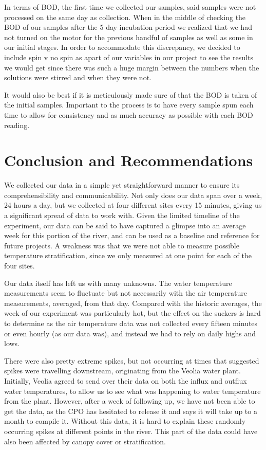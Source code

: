 \documentclass{article}
\begin{document}
In terms of BOD, the first time we collected our samples, said samples were not processed on the same day as collection. When in the middle of checking the BOD of our samples after the 5 day incubation period we realized that we had not turned on the motor for the previous handful of samples as well as some in our initial stages. In order to accommodate this discrepancy, we decided to include spin v no spin as apart of our variables in our project to see the results we would get since there was such a huge margin between the numbers when the solutions were stirred and when they were not.

It would also be best if it is meticulously made sure of that the BOD is taken of the initial samples. Important to the process is to have every sample spun each time to allow for consistency and as much accuracy as possible with each BOD reading. 


\section{Conclusion and Recommendations}
We collected our data in a simple yet straightforward manner to ensure its comprehensibility and communicability. Not only does our data span over a week, 24 hours a day, but we collected at four different sites every 15 minutes, giving us a significant spread of data to work with. Given the limited timeline of the experiment, our data can be said to have captured a glimpse into an average week for this portion of the river, and can be used as a baseline and reference for future projects. A weakness was that we were not able to measure possible temperature stratification, since we only measured at one point for each of the four sites. 

Our data itself has left us with many unknowns. The water temperature measurements seem to fluctuate but not necessarily with the air temperature measurements, averaged, from that day. Compared with the historic averages, the week of our experiment was particularly hot, but the effect on the suckers is hard to determine as the air temperature data was not collected every fifteen minutes or even hourly (as our data was), and instead we had to rely on daily highs and lows. 

There were also pretty extreme spikes, but not occurring at times that suggested spikes were travelling downstream, originating from the Veolia water plant. Initially, Veolia agreed to send over their data on both the influx and outflux water temperatures, to allow us to see what was happening to water temperature from the plant. However, after a week of following up, we have not been able to get the data, as the CPO has hesitated to release it and says it will take up to a month to compile it. Without this data, it is hard to explain these randomly occurring spikes at different points in the river. This part of the data could have also been affected by canopy cover or stratification. 
\end{document}
